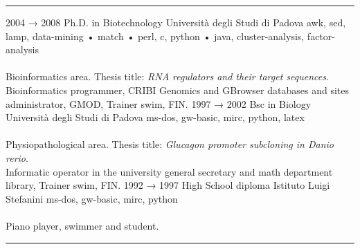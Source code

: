 \documentclass[9pt]{stackoverflow} %
\begin{document}
\textcolor{stackoverflow}{\hrule}
\vspace{4pt} %
\begin{tcolorbox}[blanker,width=0.75\textwidth,enlarge left by=0.25\textwidth,before skip=6pt,breakable,
	overlay unbroken and first={%
	  \node[inner sep=0pt,outer sep=0pt,text width=0.35\textwidth,
		align=none,
		below right]
		at ([xshift=-0.25\textwidth]frame.north west)
{
	\vspace{\baselineskip} %
	\cvsect{Education}
};}]
{\vspace{-16.3pt} %
	\small\begin{entrylist}
	\entry
		{2004 → 2008}
		{Ph.D. in Biotechnology}
		{Università degli Studi di Padova}
		{{awk, sed, lamp, data-mining	• match	• perl, c, python	• java, cluster-analysis, factor-analysis}\\\\
		Bioinformatics area. Thesis title: \emph{RNA regulators and their target sequences}.\\
		Bioinformatics programmer, CRIBI Genomics and GBrowser databases and sites administrator, GMOD, Trainer swim, FIN.}
	\entry
		{1997 → 2002}
		{Bsc in Biology}
		{Università degli Studi di Padova}
		{{ms-dos, gw-basic, mirc, python, latex}\\\\
		Physiopathological area. Thesis title: \emph{Glucagon promoter subcloning in Danio rerio}.\\
		Informatic operator in the university general secretary and math department library, Trainer swim, FIN.}
	\entry
		{1992 → 1997}
		{High School diploma}
		{Istituto Luigi Stefanini}
		{{ms-dos, gw-basic, mirc, python}\\\\
		Piano player, swimmer and student.}
	\end{entrylist}}
\end{tcolorbox}


\textcolor{stackoverflow}{\hrule}
\begin{minipage}[t]{0.25\textwidth}
	\vspace{\baselineskip} %
\end{minipage}
\begin{minipage}[t]{0.75\textwidth}
	\vspace{\baselineskip} %
	{\small
	}
\end{minipage}
\end{document}
